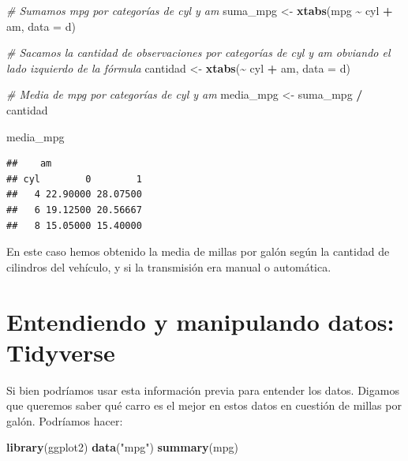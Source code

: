 \documentclass[
]{article}
\newenvironment{Shaded}{\begin{snugshade}}{\end{snugshade}}
\newcommand{\AttributeTok}[1]{\textcolor[rgb]{0.13,0.29,0.53}{#1}}
\newcommand{\CommentTok}[1]{\textcolor[rgb]{0.56,0.35,0.01}{\textit{#1}}}
\newcommand{\FunctionTok}[1]{\textcolor[rgb]{0.13,0.29,0.53}{\textbf{#1}}}
\newcommand{\NormalTok}[1]{#1}
\newcommand{\OtherTok}[1]{\textcolor[rgb]{0.56,0.35,0.01}{#1}}
\newcommand{\SpecialCharTok}[1]{\textcolor[rgb]{0.81,0.36,0.00}{\textbf{#1}}}
\newcommand{\StringTok}[1]{\textcolor[rgb]{0.31,0.60,0.02}{#1}}
\begin{document}
\begin{Shaded}
\begin{Highlighting}[]
\CommentTok{\# Sumamos mpg por categorías de cyl y am}
\NormalTok{suma\_mpg }\OtherTok{\textless{}{-}} \FunctionTok{xtabs}\NormalTok{(mpg }\SpecialCharTok{\textasciitilde{}}\NormalTok{ cyl }\SpecialCharTok{+}\NormalTok{ am, }\AttributeTok{data =}\NormalTok{ d)}

\CommentTok{\# Sacamos la cantidad de observaciones por categorías de cyl y am obviando el lado izquierdo de la fórmula}
\NormalTok{cantidad }\OtherTok{\textless{}{-}} \FunctionTok{xtabs}\NormalTok{(}\SpecialCharTok{\textasciitilde{}}\NormalTok{ cyl }\SpecialCharTok{+}\NormalTok{ am, }\AttributeTok{data =}\NormalTok{ d)}

\CommentTok{\# Media de mpg por categorías de cyl y am}
\NormalTok{media\_mpg }\OtherTok{\textless{}{-}}\NormalTok{ suma\_mpg }\SpecialCharTok{/}\NormalTok{ cantidad}

\NormalTok{media\_mpg}
\end{Highlighting}
\end{Shaded}

\begin{verbatim}
##    am
## cyl        0        1
##   4 22.90000 28.07500
##   6 19.12500 20.56667
##   8 15.05000 15.40000
\end{verbatim}

En este caso hemos obtenido la media de millas por galón según la
cantidad de cilindros del vehículo, y si la transmisión era manual o
automática.

\section{Entendiendo y manipulando datos:
Tidyverse}\label{entendiendo-y-manipulando-datos-tidyverse}

Si bien podríamos usar esta información previa para entender los datos.
Digamos que queremos saber qué carro es el mejor en estos datos en
cuestión de millas por galón. Podríamos hacer:

\begin{Shaded}
\begin{Highlighting}[]
\FunctionTok{library}\NormalTok{(ggplot2)}
\FunctionTok{data}\NormalTok{(}\StringTok{"mpg"}\NormalTok{)}
\FunctionTok{summary}\NormalTok{(mpg)}
\end{Highlighting}
\end{Shaded}
\end{document}
